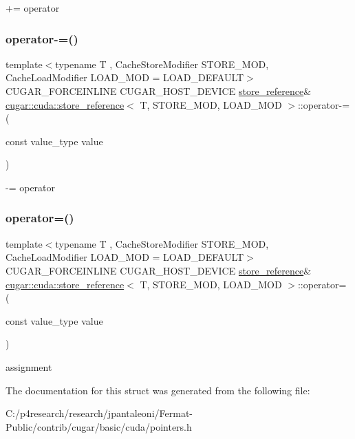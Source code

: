 += operator \mbox{\label{structcugar_1_1cuda_1_1store__reference_a76cbf538cd56f8d074db460eda0e2891}} 
\subsubsection{\texorpdfstring{operator-\/=()}{operator-=()}}
{\footnotesize\ttfamily template$<$typename T , Cache\+Store\+Modifier S\+T\+O\+R\+E\+\_\+\+M\+OD, Cache\+Load\+Modifier L\+O\+A\+D\+\_\+\+M\+OD = L\+O\+A\+D\+\_\+\+D\+E\+F\+A\+U\+LT$>$ \\
C\+U\+G\+A\+R\+\_\+\+F\+O\+R\+C\+E\+I\+N\+L\+I\+NE C\+U\+G\+A\+R\+\_\+\+H\+O\+S\+T\+\_\+\+D\+E\+V\+I\+CE \hyperlink{structcugar_1_1cuda_1_1store__reference}{store\+\_\+reference}\& \hyperlink{structcugar_1_1cuda_1_1store__reference}{cugar\+::cuda\+::store\+\_\+reference}$<$ T, S\+T\+O\+R\+E\+\_\+\+M\+OD, L\+O\+A\+D\+\_\+\+M\+OD $>$\+::operator-\/= (\begin{DoxyParamCaption}\item[{const value\+\_\+type}]{value }\end{DoxyParamCaption})\hspace{0.3cm}{\ttfamily [inline]}}

-\/= operator \mbox{\label{structcugar_1_1cuda_1_1store__reference_a0e6edeb8418e39730eed64b7821e8fc8}} 
\subsubsection{\texorpdfstring{operator=()}{operator=()}}
{\footnotesize\ttfamily template$<$typename T , Cache\+Store\+Modifier S\+T\+O\+R\+E\+\_\+\+M\+OD, Cache\+Load\+Modifier L\+O\+A\+D\+\_\+\+M\+OD = L\+O\+A\+D\+\_\+\+D\+E\+F\+A\+U\+LT$>$ \\
C\+U\+G\+A\+R\+\_\+\+F\+O\+R\+C\+E\+I\+N\+L\+I\+NE C\+U\+G\+A\+R\+\_\+\+H\+O\+S\+T\+\_\+\+D\+E\+V\+I\+CE \hyperlink{structcugar_1_1cuda_1_1store__reference}{store\+\_\+reference}\& \hyperlink{structcugar_1_1cuda_1_1store__reference}{cugar\+::cuda\+::store\+\_\+reference}$<$ T, S\+T\+O\+R\+E\+\_\+\+M\+OD, L\+O\+A\+D\+\_\+\+M\+OD $>$\+::operator= (\begin{DoxyParamCaption}\item[{const value\+\_\+type}]{value }\end{DoxyParamCaption})\hspace{0.3cm}{\ttfamily [inline]}}

assignment 

The documentation for this struct was generated from the following file\+:\begin{DoxyCompactItemize}
\item 
C\+:/p4research/research/jpantaleoni/\+Fermat-\/\+Public/contrib/cugar/basic/cuda/pointers.\+h\end{DoxyCompactItemize}
